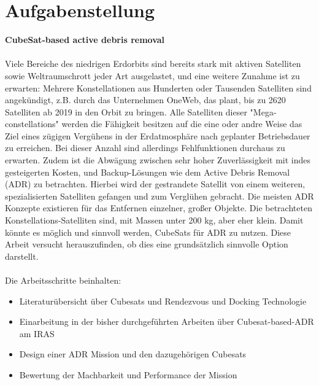 \chapter*{Aufgabenstellung}

{\large\textbf{CubeSat-based active debris removal }}\\ \\
Viele Bereiche des niedrigen Erdorbits sind bereits stark mit aktiven Satelliten sowie Weltraumschrott jeder Art ausgelastet, und eine weitere Zunahme ist zu erwarten: Mehrere Konstellationen aus Hunderten oder Tausenden Satelliten sind angekündigt, z.B. durch das Unternehmen OneWeb, das plant, bis zu 2620 Satelliten ab 2019 in den Orbit zu bringen. Alle Satelliten dieser "Mega-constellations" werden die Fähigkeit besitzen auf die eine oder andre Weise das Ziel eines zügigen Vergühens in der Erdatmosphäre nach geplanter Betriebsdauer zu erreichen. Bei dieser Anzahl sind allerdings Fehlfunktionen durchaus zu erwarten. Zudem ist die Abwägung zwischen sehr hoher Zuverlässigkeit mit indes gesteigerten Kosten, und Backup-Lösungen wie dem Active Debris Removal (ADR) zu betrachten. Hierbei wird der gestrandete Satellit von einem weiteren, spezialisierten Satelliten gefangen und zum Verglühen gebracht. 
Die meisten ADR Konzepte existieren für das Entfernen einzelner, großer Objekte. Die betrachteten Konstellations-Satelliten sind, mit Massen unter 200 kg, aber eher klein. Damit könnte es möglich und sinnvoll werden, CubeSats für ADR zu nutzen. Diese Arbeit versucht herauszufinden, ob dies eine grundsätzlich sinnvolle Option darstellt.\\ \\
Die Arbeitsschritte beinhalten:
\begin{itemize}
\item Literaturübersicht über Cubesats und Rendezvous und Docking Technologie
\item Einarbeitung in der bisher durchgeführten Arbeiten über Cubesat-based-ADR am IRAS
\item Design einer ADR Mission und den dazugehörigen Cubesats
\item Bewertung der Machbarkeit und Performance der Mission
\end{itemize}

